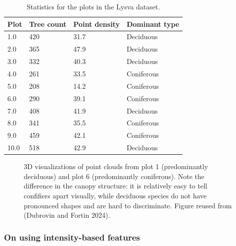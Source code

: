 \begin{table}
    \centering
    \caption{\label{tbl-lysva-plot-stats}Statistics for the plots in the
Lysva dataset.}
    \begin{tabular}{llll}
    \toprule
Plot & Tree count & Point density & Dominant type \\
    \midrule
1.0 & 420 & 31.7 & Deciduous \\
2.0 & 365 & 47.9 & Deciduous \\
3.0 & 332 & 40.3 & Deciduous \\
4.0 & 261 & 33.5 & Coniferous \\
5.0 & 208 & 14.2 & Coniferous \\
6.0 & 290 & 39.1 & Coniferous \\
7.0 & 408 & 41.9 & Deciduous \\
8.0 & 341 & 35.5 & Coniferous \\
9.0 & 459 & 42.1 & Coniferous \\
10.0 & 518 & 42.9 & Deciduous \\
    \bottomrule
    \end{tabular}
\end{table}

\begin{figure}
\caption[Comparison of canopy structure in 3D point clouds.]{\label{fig-lysva-canopy-structure}3D visualizations of point
clouds from plot 1 (predominantly deciduous) and plot 6 (predominantly
coniferous). Note the difference in the canopy structure: it is
relatively easy to tell confifiers apart visually, while deciduous
species do not have pronounced shapes and are hard to discriminate.
Figure reused from (Dubrovin and Fortin 2024).}
\end{figure}

\subsubsection{On using intensity-based features}\label{sec-intensity-based-features}

